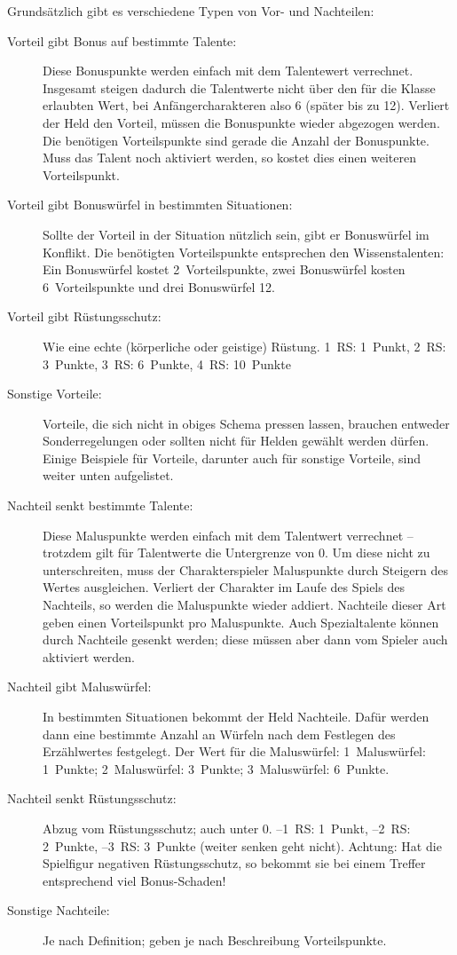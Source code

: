 Grundsätzlich gibt es verschiedene Typen von Vor- und Nachteilen:
\begin{description}
  \item[Vorteil gibt Bonus auf bestimmte Talente:] Diese Bonuspunkte werden einfach mit dem Talentewert verrechnet. Insgesamt steigen dadurch die Talentwerte nicht über den für die Klasse erlaubten Wert, bei Anfängercharakteren also 6 (später bis zu 12).  Verliert der Held den Vorteil, müssen die Bonuspunkte wieder abgezogen werden. Die benötigen Vorteilspunkte sind gerade die Anzahl der Bonuspunkte.  Muss das Talent noch aktiviert werden, so kostet dies einen weiteren Vorteilspunkt.
  
  \item[Vorteil gibt Bonuswürfel in bestimmten Situationen:] Sollte der Vorteil in der Situation nützlich sein, gibt er Bonuswürfel im Konflikt. Die benötigten Vorteilspunkte entsprechen den Wissenstalenten: Ein Bonuswürfel kostet 2~Vorteilspunkte, zwei Bonuswürfel kosten 6~Vorteilspunkte und drei Bonuswürfel 12.

  \item[Vorteil gibt Rüstungsschutz:] Wie eine echte (körperliche oder geistige) Rüstung. 1~RS: 1~Punkt, 2~RS: 3~Punkte, 3~RS: 6~Punkte, 4~RS: 10~Punkte 
  
  \item[Sonstige Vorteile:]  Vorteile, die sich nicht in obiges Schema pressen lassen, brauchen entweder Sonderregelungen oder sollten nicht für Helden gewählt werden dürfen. Einige Beispiele für Vorteile, darunter auch für sonstige Vorteile, sind weiter unten aufgelistet.

  \item[Nachteil senkt bestimmte Talente:] Diese Maluspunkte werden einfach mit dem Talentwert verrechnet  -- trotzdem gilt für Talentwerte die Untergrenze von 0. Um diese nicht zu unterschreiten, muss der Charakterspieler Maluspunkte durch Steigern des Wertes ausgleichen. Verliert der Charakter im Laufe des Spiels des Nachteils, so werden die Maluspunkte wieder addiert. Nachteile dieser Art geben einen Vorteilspunkt pro Maluspunkte. Auch Spezialtalente können durch Nachteile gesenkt werden; diese müssen aber dann vom Spieler auch aktiviert werden.

  \item[Nachteil gibt Maluswürfel:]  In bestimmten Situationen bekommt der Held Nachteile. Dafür werden dann eine bestimmte Anzahl an Würfeln nach dem Festlegen des Erzählwertes festgelegt. Der Wert für die Maluswürfel:  1~Maluswürfel: 1~Punkte; 2~Maluswürfel: 3~Punkte; 3~Maluswürfel: 6~Punkte.

  \item[Nachteil senkt Rüstungsschutz:] Abzug vom Rüstungsschutz; auch unter 0. --1~RS: 1~Punkt, --2~RS: 2~Punkte, --3~RS: 3~Punkte (weiter senken geht nicht). Achtung: Hat die Spielfigur negativen Rüstungsschutz, so bekommt sie bei einem Treffer entsprechend viel Bonus-Schaden!

  \item[Sonstige Nachteile:] Je nach Definition; geben je nach Beschreibung Vorteilspunkte.
\end{description}

